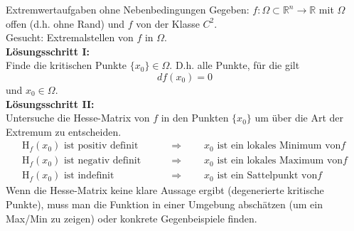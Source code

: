 \begin{Rezept}[label=R1]{Extremwertaufgaben ohne Nebenbedingungen}{}
	Gegeben: $f:\Omega\subset \mathbb{R}^n \to \mathbb{R}$ mit $\Omega$ offen (d.h. ohne Rand) und $f$ von der Klasse $C^2$.\\
	Gesucht: Extremalstellen von $f$ in $\Omega$.\\
	\newline
	\textbf{Lösungsschritt I:}\\
	Finde die kritischen Punkte $\{x_0\} \in \Omega$. D.h. alle Punkte, für die gilt
	\begin{equation*}
	df(x_0)=0
	\end{equation*}
	und $x_0 \in \Omega$.\\
	\textbf{Lösungsschritt II:}\\
	Untersuche die Hesse-Matrix von $f$ in den Punkten $\{x_0\}$ um über die Art der Extremum zu entscheiden.
	\begin{align*}
	\text{H}_f(x_0) \text{ ist positiv definit} \qquad &\Rightarrow \qquad x_0 \text{ ist ein lokales Minimum von} f\\
	\text{H}_f(x_0) \text{ ist negativ definit} \qquad &\Rightarrow \qquad x_0 \text{ ist ein lokales Maximum von} f\\
	\text{H}_f(x_0) \text{ ist indefinit} \qquad &\Rightarrow \qquad x_0 \text{ ist ein Sattelpunkt von} f
	\end{align*}
	Wenn die Hesse-Matrix keine klare Aussage ergibt (degenerierte kritische Punkte), muss man die Funktion in einer Umgebung abschätzen (um ein Max/Min zu zeigen) oder konkrete Gegenbeispiele finden.
\end{Rezept}


